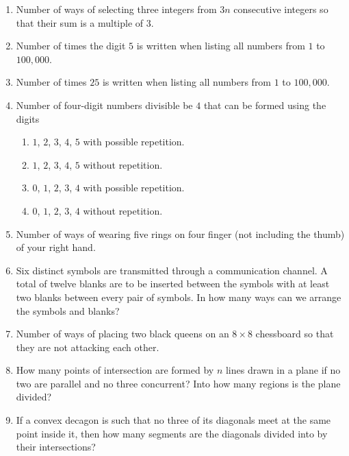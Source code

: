 \documentclass[svgnames]{amsart}
\begin{document}
\begin{enumerate}[leftmargin=*]
\item Number of ways of selecting three integers from $3n$ consecutive integers so that their sum is a multiple of $3$.

\item Number of times the digit $5$ is written when listing all numbers from $1$ to $100,000$.

\item Number of times $25$ is written when listing all numbers from $1$ to $100,000$.

\item Number of four-digit numbers divisible be $4$ that can be formed using the digits
\begin{enumerate}[label=(\roman*)]
	\item $1$, $2$, $3$, $4$, $5$ with possible repetition.
	\item $1$, $2$, $3$, $4$, $5$ without repetition.
	\item $0$, $1$, $2$, $3$, $4$ with possible repetition.
	\item $0$, $1$, $2$, $3$, $4$ without repetition.	
\end{enumerate}

\item Number of ways of wearing five rings on four finger (not including the thumb) of your right hand.

\item Six distinct symbols are transmitted through a communication channel. A total of twelve blanks are to be inserted between the symbols with at least two blanks between every pair of symbols. In how many ways can we arrange the symbols and blanks?

\item Number of ways of placing two black queens on an $8 \times 8$ chessboard so that they are not attacking each other.

\item How many points of intersection are formed by $n$ lines drawn in a plane if no two are parallel and no three concurrent? Into how many regions is the plane divided?

\item If a convex decagon is such that no three of its diagonals meet at the same point inside it, then how many segments are the diagonals divided into by their intersections?
\end{enumerate}
\end{document}
